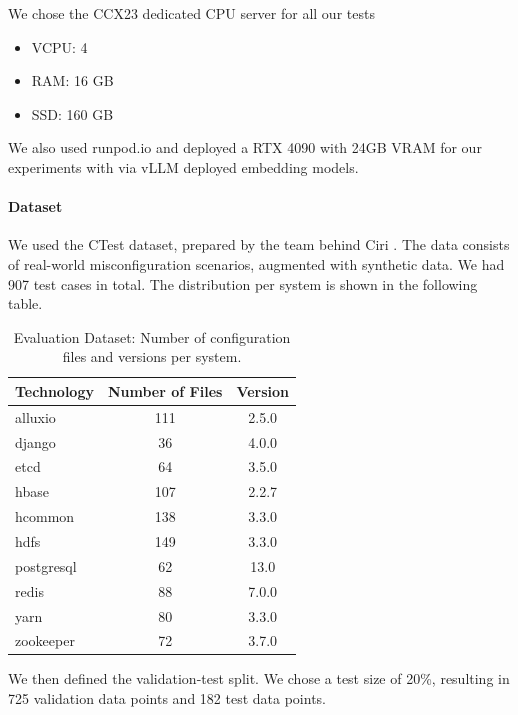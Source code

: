We chose the CCX23 dedicated CPU server\cite{hetzner-online-gmbh-2025} for all our tests
\begin{itemize}
    \item VCPU: 4
    \item RAM: 16 GB
    \item SSD: 160 GB
\end{itemize}

We also used runpod.io\cite{runpod-2025} and deployed a RTX 4090 with 24GB VRAM for our experiments with via vLLM \cite{Kwon.12.09.2023} deployed embedding models.

\paragraph{Dataset} 
We used the CTest dataset, prepared by the team behind Ciri \cite{Lian.2024}\cite{xlab-uiuc-2025}. The data consists of real-world misconfiguration scenarios, augmented with synthetic data. We had 907 test cases in total. The distribution per system is shown in the following table.

\begin{table}[h]
    \centering
    \begin{tabular}{|l|c|c|}
        \hline
        \textbf{Technology} & \textbf{Number of Files} & \textbf{Version} \\
        \hline
        alluxio & 111 & 2.5.0 \\
        django & 36 & 4.0.0 \\
        etcd & 64 & 3.5.0 \\
        hbase & 107 & 2.2.7 \\
        hcommon & 138 & 3.3.0 \\
        hdfs & 149 & 3.3.0 \\
        postgresql & 62 & 13.0 \\
        redis & 88 & 7.0.0 \\
        yarn & 80 & 3.3.0 \\
        zookeeper & 72 & 3.7.0 \\
        \hline
    \end{tabular}
    \caption{Evaluation Dataset: Number of configuration files and versions per system.}
    \label{tab:technology_values}
\end{table}

We then defined the validation-test split. We chose a test size of 20\%, resulting in 725 validation data points and 182 test data points.  

